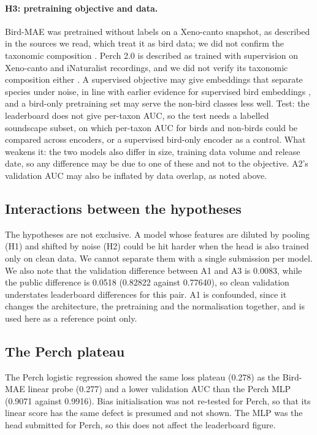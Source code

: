\documentclass[letterpaper]{article} %
\begin{document}
\paragraph{H3: pretraining objective and data.}
Bird-MAE was pretrained without labels on a Xeno-canto snapshot, as described in the sources we read, which treat it as bird data; we did not confirm the taxonomic composition \citep{rauch2025can,rauch2025birdset}. Perch 2.0 is described as trained with supervision on Xeno-canto and iNaturalist recordings, and we did not verify its taxonomic composition either \citep{vanmerrienboer2025perch}. A supervised objective may give embeddings that separate species under noise, in line with earlier evidence for supervised bird embeddings \citep{ghani2023global}, and a bird-only pretraining set may serve the non-bird classes less well. Test: the leaderboard does not give per-taxon AUC, so the test needs a labelled soundscape subset, on which per-taxon AUC for birds and non-birds could be compared across encoders, or a supervised bird-only encoder as a control. What weakens it: the two models also differ in size, training data volume and release date, so any difference may be due to one of these and not to the objective. A2's validation AUC may also be inflated by data overlap, as noted above.

\subsection{Interactions between the hypotheses}
The hypotheses are not exclusive. A model whose features are diluted by pooling (H1) and shifted by noise (H2) could be hit harder when the head is also trained only on clean data. We cannot separate them with a single submission per model. We also note that the validation difference between A1 and A3 is 0.0083, while the public difference is 0.0518 (0.82822 against 0.77640), so clean validation understates leaderboard differences for this pair. A1 is confounded, since it changes the architecture, the pretraining and the normalisation together, and is used here as a reference point only.

\subsection{The Perch plateau}
The Perch logistic regression showed the same loss plateau (0.278) as the Bird-MAE linear probe (0.277) and a lower validation AUC than the Perch MLP (0.9071 against 0.9916). Bias initialisation was not re-tested for Perch, so that its linear score has the same defect is presumed and not shown. The MLP was the head submitted for Perch, so this does not affect the leaderboard figure.
\end{document}
